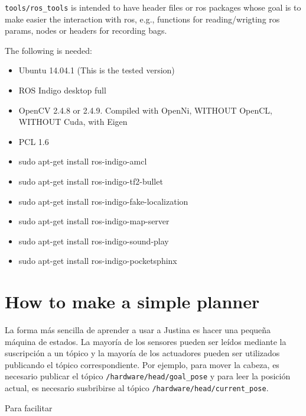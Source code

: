 \documentclass[letterpaper,10pt]{article}
\begin{document}
\texttt{tools/ros\_tools} is intended to have header files or ros packages whose goal is to make easier the interaction with ros, e.g., functions for reading/wrigting ros params, nodes or headers for recording bags. 

The following is needed:
\begin{itemize}
\item Ubuntu 14.04.1 (This is the tested version)
\item ROS Indigo desktop full
\item OpenCV 2.4.8 or 2.4.9. Compiled with OpenNi, WITHOUT OpenCL, WITHOUT Cuda, with Eigen
\item PCL 1.6
\end{itemize}

\begin{itemize}
\item sudo apt-get install ros-indigo-amcl
\item sudo apt-get install ros-indigo-tf2-bullet
\item sudo apt-get install ros-indigo-fake-localization
\item sudo apt-get install ros-indigo-map-server
\item sudo apt-get install ros-indigo-sound-play
\item sudo apt-get install ros-indigo-pocketsphinx
\end{itemize}

\section{How to make a simple planner}
La forma más sencilla de aprender a usar a Justina es hacer una pequeña máquina de estados.
La mayoría de los  sensores pueden ser leídos mediante la suscripción a un tópico y la mayoría de los actuadores pueden ser utilizados publicando el tópico correspondiente. Por ejemplo, para mover la cabeza, es necesario publicar el tópico \texttt{/hardware/head/goal\_pose} y para leer la posición actual, es necesario susbribirse al tópico \texttt{/hardware/head/current\_pose}.

Para facilitar 



\end{document}
